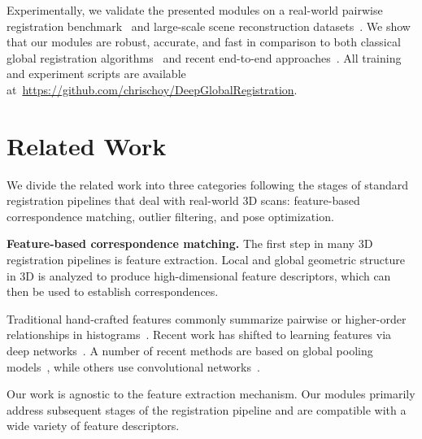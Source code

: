 \documentclass[10pt,twocolumn,letterpaper]{article}
\begin{document}
Experimentally,
we validate the presented modules on a real-world pairwise registration benchmark~\cite{zeng20163dmatch} and large-scale scene reconstruction datasets~\cite{ahanda2014icra,choi2015cvpr,Park2017}.
We show that our modules are robust, accurate, and fast in comparison to both classical global registration algorithms~\cite{zhou2016eccv,rusu2009icra,yang2015go} and recent end-to-end approaches~\cite{dias2019corr, wang2019deep, aoki2019pointnetlk}.
All training and experiment scripts are available at~{\small \url{https://github.com/chrischoy/DeepGlobalRegistration}}.
 \section{Related Work}









We divide the related work into three categories following the stages of standard registration pipelines that deal with real-world 3D scans: feature-based correspondence matching, outlier filtering, and pose optimization.


\noindent \textbf{Feature-based correspondence matching.}
The first step in many 3D registration pipelines is feature extraction. Local and global geometric structure in 3D is analyzed to produce high-dimensional feature descriptors, which can then be used to establish correspondences.

Traditional hand-crafted features commonly summarize pairwise or higher-order relationships in histograms~\cite{johnson1999spin, shot, usc, pfh, rusu2009icra}.
Recent work has shifted to learning features via deep networks~\cite{zeng20163dmatch,cgf}. A number of recent methods are based on global pooling models~\cite{ppf, ppf_fold, Zhao2019}, while others use convolutional networks~\cite{perfectmatch, FCGF2019}.

Our work is agnostic to the feature extraction mechanism. Our modules primarily address subsequent stages of the registration pipeline and are compatible with a wide variety of feature descriptors.
\end{document}
